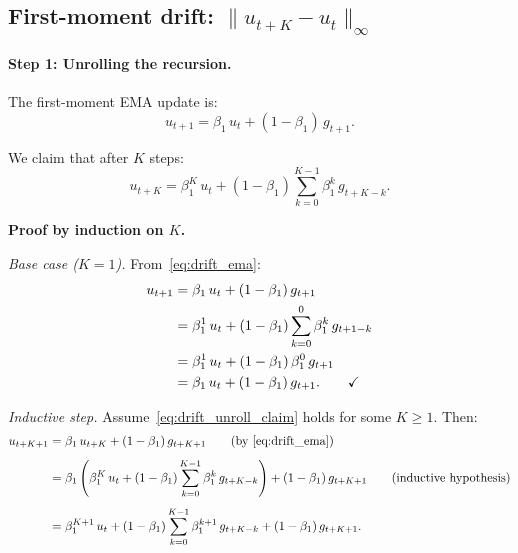 \documentclass{article}
\begin{document}
\subsection{First-moment drift: $\|u_{t+K} - u_t\|_\infty$}
\label{sec:drift_first}

\paragraph{Step 1: Unrolling the recursion.}

The first-moment EMA update is:
\begin{equation}
u_{t+1} = \beta_1\,u_t + (1-\beta_1)\,g_{t+1}.
\label{eq:drift_ema}
\end{equation}

We claim that after $K$ steps:
\begin{equation}
u_{t+K} = \beta_1^K\,u_t + (1-\beta_1)\sum_{k=0}^{K-1}\beta_1^k\,g_{t+K-k}.
\label{eq:drift_unroll_claim}
\end{equation}

\noindent\textbf{Proof by induction on $K$.}

\emph{Base case ($K = 1$).}
From~\eqref{eq:drift_ema}:
\begin{align}
u_{t+1}
&= \beta_1\,u_t + (1-\beta_1)\,g_{t+1} \notag \\
&= \beta_1^1\,u_t + (1-\beta_1)\sum_{k=0}^{0}\beta_1^k\,g_{t+1-k} \notag \\
&= \beta_1^1\,u_t + (1-\beta_1)\,\beta_1^0\,g_{t+1} \notag \\
&= \beta_1\,u_t + (1-\beta_1)\,g_{t+1}. \qquad\checkmark
\label{eq:drift_base}
\end{align}

\emph{Inductive step.}
Assume~\eqref{eq:drift_unroll_claim} holds for some $K \geq 1$. Then:
\begin{align}
u_{t+K+1}
&= \beta_1\,u_{t+K} + (1-\beta_1)\,g_{t+K+1}
\qquad\text{(by~\eqref{eq:drift_ema})}
\notag \\[4pt]
&= \beta_1\left(\beta_1^K\,u_t
   + (1-\beta_1)\sum_{k=0}^{K-1}\beta_1^k\,g_{t+K-k}\right)
   + (1-\beta_1)\,g_{t+K+1}
\qquad\text{(inductive hypothesis)}
\notag \\[4pt]
&= \beta_1^{K+1}\,u_t
   + (1-\beta_1)\sum_{k=0}^{K-1}\beta_1^{k+1}\,g_{t+K-k}
   + (1-\beta_1)\,g_{t+K+1}.
\label{eq:drift_ind_expand}
\end{align}
\end{document}

